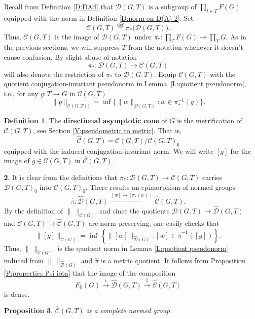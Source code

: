 \documentclass[12pt]{amsart}
\newtheorem{prop}{Proposition}[section]
\theoremstyle{definition}
\newtheorem{defn}[prop]{Definition}
\newtheorem{void}[prop]{}
\def\RR{\ensuremath{\mathbb{R}}}
\newcommand{\C}[1]{\mathcal{#1}}
\newcommand{\xto}[1]{\xrightarrow{#1}}
\def\Free{F}
\def\D{\mathcal{D}}
\def\tC{\hat{\mathcal{C}}}
\def\tD{\hat{\D}}
\begin{document}
Recall from Definition \ref{D:DAd} that $\C D(G,T)$ is a subgroup of $\prod_{t \in T} \Free(G)$  equipped with the norm in Definition \ref{D:norm on D(A) 2}.
Set 
\[
\C C(G,T) \overset{\text{def}}{=} \pi_*\big(\C D(G,T)\big).
\]
Thus, $\C C(G,T)$ is the image of $\C D(G,T)$ under $\pi_* \colon \prod_T \Free(G) \to \prod_T G$.
As in the previous sections, we will suppress $T$  from the notation whenever it doesn't cause confusion. 
By slight abuse of notation 
\[
\pi_* \colon \C D(G,T) \to \C C(G,T)
\]
will also denote the restriction of $\pi_*$ to $\C D(G,T)$.
Equip $\C C(G,T)$ with the quotient conjugation-invariant pseudonorm in Lemma~\ref{L:quotient pseudonorm}, i.e., for any $g \colon T \to G$ in $\C C(G,T)$
\[
\| g \|_{\C C(G,T))} = \inf \big\{ \|w\|_{\C D(G,T)} :  w \in \pi_*^{-1}(g) \big\}.
\]



\begin{defn}\label{D:tC}
The {\bf directional asymptotic cone} of $G$ is the metrification of $\C C(G,T)$, see Section \ref{V:pseudometric to metric}.
That is,
\[
\tC(G,T) = \C C(G,T)/\C C(G,T)_0
\]
equipped with the induced conjugation-invariant norm. 
We will write $[g]$ for the image of $g \in \C C(G,T)$ in $\tC(G,T)$.
\end{defn}




\begin{void}\label{V:hat pi construction}
It is clear from the definitions that $\pi_* \colon \C D(G,T) \to \C C(G,T)$ carries $\C D(G,T)_0$ into $\C C(G,T)_0$.
There results an epimorphism of normed groups
\[
\hat{\pi} \colon \tD(G,T) \xto{\ [w] \mapsto [\pi_*(w)] \ } \tC(G,T). %
\]
By the definition of $\| \ \|_{\C C(G)}$ and since the quotients $\C D(G,T) \to \tD(G,T)$ and $\C C(G,T) \to \tC(G,T)$ are norm preserving, one easily checks that
\[
\| [g]\|_{\tC(G)} = \inf \, \left\{ \|[w]\|_{\tD(G)} : [w] \in \hat{\pi}^{-1}([g]) \right\}.
\]
Thus, $\| \ \|_{\tC(G)}$ is the quotient norm in Lemma \ref{L:quotient pseudonorm} induced from $\| \ \|_{\tD(G)}$ and $\hat{\pi}$ is a metric quotient.
It follows from Proposition \ref{P:properties Psi iota} that the image of the composition
\[
\Free_\RR(G) \xto{\iota} \tD(G,T) \xto{\hat{\pi}} \tC(G,T)
\]
is dense.
\end{void}







\begin{prop}\label{P:tC is complete} %
$\tC(G,T)$ is a complete normed group.
\end{prop}
\end{document}
